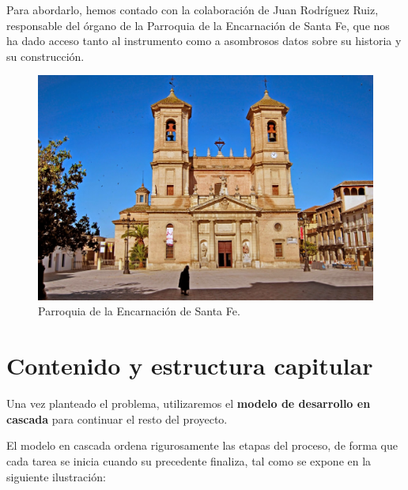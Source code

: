 Para abordarlo, hemos contado con la colaboración de Juan Rodríguez Ruiz, responsable del órgano de la Parroquia de la Encarnación de Santa Fe, que nos ha dado acceso tanto al instrumento como a asombrosos datos sobre su historia y su construcción.

\smallskip

\begin{figure}[H]
\noindent \begin{centering}
\includegraphics[width=\linewidth]{capitulo1/figura11}
\par\end{centering}
\smallskip
\caption[Parroquia de la Encarnación de Santa Fe.]{\label{fig:figura11} Parroquia de la Encarnación de Santa Fe. \cite{iglesias_granada}}
\end{figure}

\newpage

\section{Contenido y estructura capitular}

Una vez planteado el problema, utilizaremos el \textbf{modelo de desarrollo en cascada} para continuar el resto del proyecto.

El modelo en cascada ordena rigurosamente las etapas del proceso, de forma que cada tarea se inicia cuando su precedente finaliza, tal como se expone en la siguiente ilustración:

\smallskip

